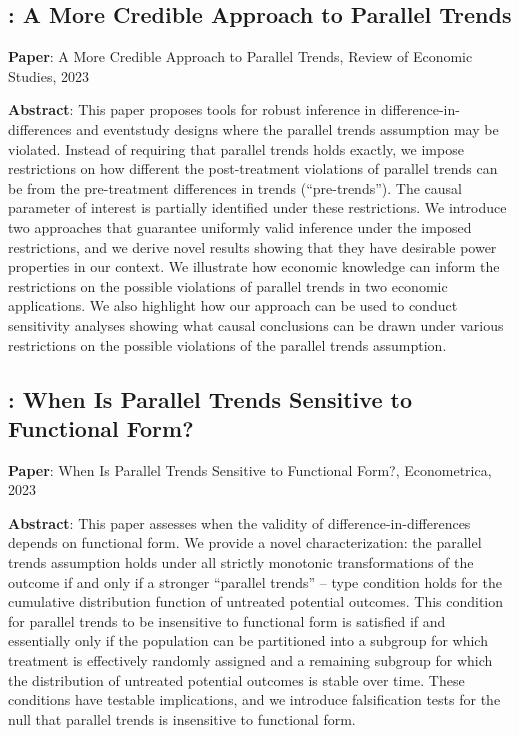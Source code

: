 \documentclass[12pt]{article}
\theoremstyle{definition}
\begin{document}
\subsection{\citet{rambachanMoreCredibleApproach2023}: A More Credible Approach to Parallel Trends}

{\bf Paper}: A More Credible Approach to Parallel Trends, Review of Economic Studies, 2023

{\bf Abstract}: This paper proposes tools for robust inference in difference-in-differences and eventstudy designs where the parallel trends assumption may be violated. Instead of requiring that parallel trends holds exactly, we impose restrictions on how different the post-treatment violations of parallel trends can be from the pre-treatment differences in trends (``pre-trends''). The causal parameter of interest is partially identified under these restrictions. We introduce two approaches that guarantee uniformly valid inference under the imposed restrictions, and we derive novel results showing that they have desirable power properties in our context. We illustrate how economic knowledge can inform the restrictions on the possible violations of parallel trends in two economic applications. We also highlight how our approach can be used to conduct sensitivity analyses showing what causal conclusions can be drawn under various restrictions on the possible violations of the parallel trends assumption.

\subsection{\citet{rothWhenParallelTrends2023}: When Is Parallel Trends Sensitive to Functional Form?}

{\bf Paper}: When Is Parallel Trends Sensitive to Functional Form?, Econometrica, 2023

{\bf Abstract}: This paper assesses when the validity of difference-in-differences depends on functional form. We provide a novel characterization: the parallel trends assumption holds under all strictly monotonic transformations of the outcome if and only if a stronger ``parallel trends'' -- type condition holds for the cumulative distribution function of untreated potential outcomes. This condition for parallel trends to be insensitive to functional form is satisfied if and essentially only if the population can be partitioned into a subgroup for which treatment is effectively randomly assigned and a remaining subgroup for which the distribution of untreated potential outcomes is stable over time. These conditions have testable implications, and we introduce falsification tests for the null that parallel trends is insensitive to functional form.
\end{document}
